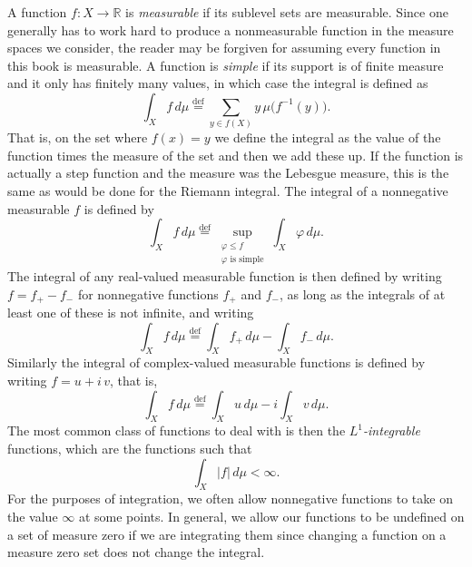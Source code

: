 \documentclass[12pt,openany]{book}
\newcommand{\sabs}[1]{\lvert {#1} \rvert}
\newcommand{\R}{{\mathbb{R}}}
\newcommand{\myindex}[1]{#1\index{#1}}
\theoremstyle{plain}
\theoremstyle{remark}
\theoremstyle{definition}
\theoremstyle{exercise}
\theoremstyle{example}
\begin{document}
A function $f \colon X \to \R$ is
\emph{measurable} if its sublevel
sets are measurable.
Since one generally has to work hard to produce a
\myindex{nonmeasurable function}
in the measure spaces we consider,
the reader may be forgiven for assuming every function in
this book is measurable.
A function is
\emph{simple}
if its support is of finite
measure and it only has finitely many values, in which case the integral is
defined as
\begin{equation*}
\int_X f\, d \mu
\overset{\text{def}}{=}
\sum_{y \in f(X)}
y \, \mu\bigl(f^{-1}(y)\bigr) .
\end{equation*}
That is, on the set where $f(x)=y$ we define the integral as the value of
the function times the measure of the set and then we add these up.
If the function is actually a step function and the measure was the Lebesgue
measure, this is the same as would be done for the Riemann integral.
The integral of a nonnegative measurable $f$ is defined by
\begin{equation*}
\int_X f\, d \mu
\overset{\text{def}}{=}
\sup_{\substack{\varphi \leq f \\ \varphi \text{ is simple}}}
\int_X \varphi \, d\mu .
\end{equation*}
The integral of any real-valued measurable function is
then defined by writing $f = f_+ - f_-$ for
nonnegative functions $f_+$ and $f_-$, as long as
the integrals of at least one of these is not infinite, and writing
\begin{equation*}
\int_X f\, d \mu
\overset{\text{def}}{=}
\int_X f_+\, d \mu
-
\int_X f_-\, d \mu .
\end{equation*}
Similarly the integral of
complex-valued measurable functions is defined by writing $f = u + i \, v$,
that is,
\begin{equation*}
\int_X f\, d \mu
\overset{\text{def}}{=}
\int_X u\, d \mu
-
i
\int_X v\, d \mu .
\end{equation*}
The most common class of functions to deal with is then the
\emph{$L^1$-integrable}
functions, which are the functions such that
\begin{equation*}
\int_X \sabs{f} \, d\mu < \infty .
\end{equation*}
For the purposes of integration, we often allow nonnegative
functions to take on the value $\infty$ at some points.
In general, we allow our functions to
be undefined on a set of measure zero if we are integrating them since
changing a function on a measure zero set does not change the integral.
\end{document}
